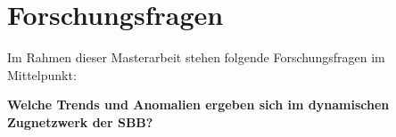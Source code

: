 \chapter{Forschungsfragen}
\label{kap:forschungsfragen}

Im Rahmen dieser Masterarbeit stehen folgende Forschungsfragen im Mittelpunkt:

\textbf{Welche Trends und Anomalien ergeben sich im dynamischen Zugnetzwerk der SBB?}